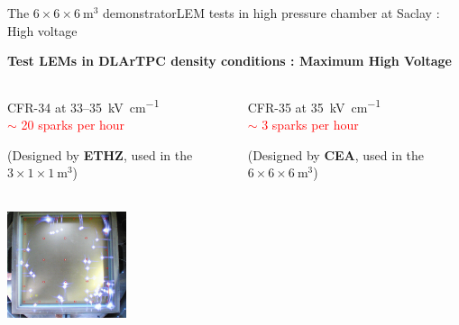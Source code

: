 \documentclass[10pt]{beamer}
\begin{document}
    \begin{frame}{The \texorpdfstring{$6 \times 6 \times \SI{6}{\meter\cubed}$}{666} demonstrator}{LEM tests in high pressure chamber at Saclay : High voltage}
    	\begin{center}
	    	\begin{scriptsize}
	    		\textbf{Test LEMs in DLArTPC density conditions : Maximum High Voltage}
	    	\end{scriptsize} 
	    \end{center}
	    \vspace{-0.5cm}
   		\begin{columns}
    		\begin{column}{0.5\textwidth}
    			\begin{center}
	    			\begin{scriptsize}
		    			CFR-34 at 33--\SI{35}{\kilo\volt\per\centi\meter}\\
		    			\textcolor{red}{$\sim$ 20 sparks per hour}\\
		    		\end{scriptsize}
	    			\begin{tiny}
		    			(Designed by \textbf{ETHZ}, used in the $3 \times 1 \times \SI{1}{\meter\cubed}$)
		    		\end{tiny}\\
	    			\includegraphics[height=3.1cm]{figures/666/sparks_34.png}
    			\end{center}
    		\end{column}\hfill
    		\begin{column}{0.5\textwidth}
    			\begin{center}
	    			\begin{scriptsize}
		    			CFR-35 at \SI{35}{\kilo\volt\per\centi\meter} \\
		    			\textcolor{red}{$\sim$ 3 sparks per hour}\\
		    		\end{scriptsize}
	    			\begin{tiny}
	    				(Designed by \textbf{CEA}, used in the $6 \times 6 \times \SI{6}{\meter\cubed}$)
	   				\end{tiny}\\

\end{center}
\end{column}
\end{columns}
\end{frame}
\end{document}

